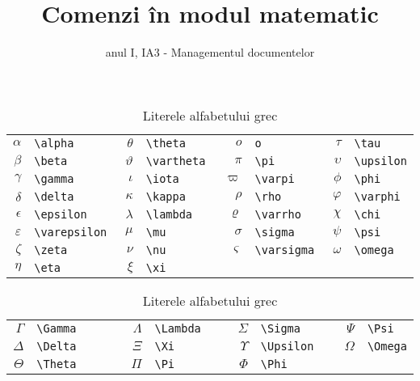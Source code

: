 \documentclass{article}
\title{Comenzi în modul matematic}
\author{anul I, IA3 - Managementul documentelor}
\begin{document}
\maketitle
\listoftables
\begin{table}

\begin{tabular}{rlrlrlrl}
$\alpha$     &\verb|\alpha  |     &$\theta$   &\verb|\theta  |   &$o$        &\verb|o  |       &$\tau$    &\verb|\tau|\\
$\beta$      &\verb|\beta   |     &$\vartheta$&\verb|\vartheta  |&$\pi$      &\verb|\pi  |     &$\upsilon$&\verb|\upsilon|\\
$\gamma$     &\verb|\gamma  |     &$\iota$    &\verb|\iota  |    &$\varpi$   &\verb|\varpi  |  &$\phi$    &\verb|\phi|\\
$\delta$     &\verb|\delta  |     &$\kappa$   &\verb|\kappa  |   &$\rho$     &\verb|\rho  |    &$\varphi$ &\verb|\varphi|\\
$\epsilon$   &\verb|\epsilon  |   &$\lambda$  &\verb|\lambda  |  &$\varrho$  &\verb|\varrho|   &$\chi$    &\verb|\chi|\\
$\varepsilon$&\verb|\varepsilon  |&$\mu$      &\verb|\mu  |      &$\sigma$   &\verb|\sigma  |  &$\psi$    &\verb|\psi|\\
$\zeta$      &\verb|\zeta  |      &$\nu$      &\verb|\nu  |      &$\varsigma$&\verb|\varsigma  |&$\omega$  &\verb|\omega  |\\
$\eta$       &\verb|\eta  |       &$\xi$      &\verb|\xi  |\\
\end{tabular}

\begin{tabular}{rlrlrlrl}
$\Gamma$    &\verb|\Gamma       |&$\Lambda$  &\verb|\Lambda    |&$\Sigma$   &\verb|\Sigma   |  &$\Psi$  &\verb|\Psi|\\
$\Delta$    &\verb|\Delta       |&$\Xi$      &\verb|\Xi        |&$\Upsilon$ &\verb|\Upsilon   |&$\Omega$&\verb|\Omega|\\
$\Theta$    &\verb|\Theta       |&$\Pi$      &\verb|\Pi        |&$\Phi$     &\verb|\Phi|\\
\end{tabular}
\caption{Literele alfabetului grec}
\end{table}
\end{document}
